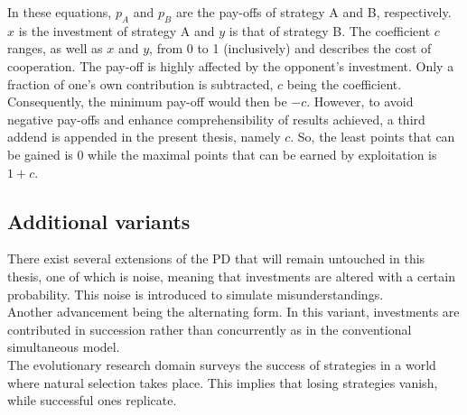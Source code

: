 \documentclass[11pt]{article}
\begin{document}
\noindent
In these equations, $p_A$ and $p_B$ are the pay-offs of strategy A and B, respectively.
$x$ is the investment of strategy A and $y$ is that of strategy B.
The coefficient $c$ ranges, as well as $x$ and $y$, from 0 to 1 (inclusively) and describes the cost of cooperation.
The pay-off is highly affected by the opponent's investment.
Only a fraction of one's own contribution is subtracted, $c$ being the coefficient.
Consequently, the minimum pay-off would then be $-c$.
However, to avoid negative pay-offs and enhance comprehensibility of results achieved, a third addend is appended in the present thesis, namely $c$.
So, the least points that can be gained is 0 while the maximal points that can be earned by exploitation is $1 + c$.



\subsection{Additional variants}

There exist several extensions of the PD that will remain untouched in this thesis, one of which is noise, meaning that investments are altered with a certain probability.
This noise is introduced to simulate misunderstandings.\\
Another advancement being the alternating form.
In this variant, investments are contributed in succession rather than concurrently as in the conventional simultaneous model.\\
The evolutionary research domain surveys the success of strategies in a world where natural selection takes place.
This implies that losing strategies vanish, while successful ones replicate.
\end{document}
